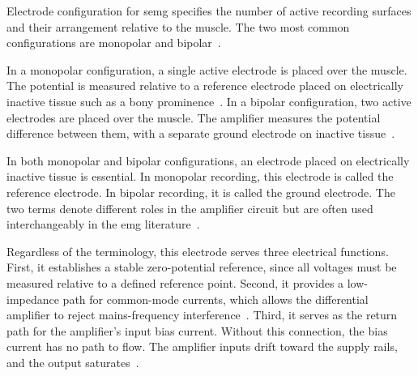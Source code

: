 Electrode configuration for \gls{semg} specifies the number of active recording surfaces and their arrangement relative to the muscle. The two most common configurations are monopolar and bipolar~\cite{kamen_essentials_2010}.

In a monopolar configuration, a single active electrode is placed over the muscle. The potential is measured relative to a reference electrode placed on electrically inactive tissue such as a bony prominence~\cite{kamen_essentials_2010}. In a bipolar configuration, two active electrodes are placed over the muscle. The amplifier measures the potential difference between them, with a separate ground electrode on inactive tissue~\cite{kamen_essentials_2010, beck_comparison_2007}.

In both monopolar and bipolar configurations, an electrode placed on electrically inactive tissue is essential. In monopolar recording, this electrode is called the reference electrode. In bipolar recording, it is called the ground electrode. The two terms denote different roles in the amplifier circuit but are often used interchangeably in the \gls{emg} literature~\cite{kamen_essentials_2010}.

Regardless of the terminology, this electrode serves three electrical functions. First, it establishes a stable zero-potential reference, since all voltages must be measured relative to a defined reference point. Second, it provides a low-impedance path for common-mode currents, which allows the differential amplifier to reject mains-frequency interference~\cite{kamen_essentials_2010}. Third, it serves as the return path for the amplifier's input bias current. Without this connection, the bias current has no path to flow. The amplifier inputs drift toward the supply rails, and the output saturates~\cite{noauthor_ina828_nodate}.


